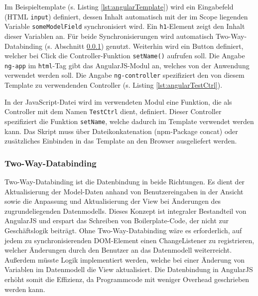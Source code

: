 \begin{figure}[H]

\end{figure}

Im Beispieltemplate (s. Listing \ref{lst:angularTemplate}) wird ein Eingabefeld (HTML \texttt{input}) definiert, dessen Inhalt automatisch mit der im Scope liegenden Variable \texttt{someModelField} synchronisiert wird. Ein \texttt{h1}-Element zeigt den Inhalt dieser Variablen an. Für beide Synchronisierungen wird automatisch Two-Way-Databinding (s. Abschnitt \ref{sec:twoWayDatabinding}) genutzt. Weiterhin wird ein Button definiert, welcher bei Click die Controller-Funktion \texttt{setName()} aufrufen soll. Die Angabe \texttt{ng-app} im \texttt{html}-Tag gibt das AngularJS-Modul an, welches von der Anwendung verwendet werden soll. Die Angabe \texttt{ng-controller} spezifiziert den von diesem Template zu verwendenden Controller (s. Listing \ref{lst:angularTestCtrl}).

\begin{figure}[H]
	
\end{figure}

In der JavaScript-Datei wird im verwendeten Modul eine Funktion, die als Controller mit dem Namen \texttt{TestCtrl} dient, definiert. Dieser Controller spezifiziert die Funktion \texttt{setName}, welche dadurch im Template verwendet werden kann. Das Skript muss über Dateikonkatenation (npm-Package \glqq concat\grqq \cite{npm-concat}) oder zusätzliches Einbinden in das Template an den Browser ausgeliefert werden.

\subsubsection{Two-Way-Databinding}
\label{sec:twoWayDatabinding}
Two-Way-Databinding ist die Datenbindung in beide Richtungen. Es dient der Aktualisierung der Model-Daten anhand von Benutzereingaben in der Ansicht sowie die Anpassung und Aktualisierung der View bei Änderungen des zugrundeliegenden Datenmodells. Dieses Konzept ist integraler Bestandteil von AngularJS und erspart das Schreiben von Boilerplate-Code, der nicht zur Geschäftslogik beiträgt. Ohne Two-Way-Databinding wäre es erforderlich, auf jedem zu synchronisierenden DOM-Element einen ChangeListener zu registrieren, welcher Änderungen durch den Benutzer an das Datenmodell weiterreicht. Außerdem müsste Logik implementiert werden, welche bei einer Änderung von Variablen im Datenmodell die View aktualisiert. Die Datenbindung in AngularJS erhöht somit die Effizienz, da Programmcode mit weniger Overhead geschrieben werden kann.\cite[][24]{angular-boehm}

